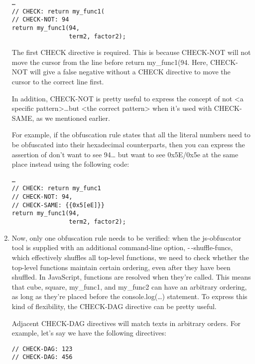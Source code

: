 \begin{enumerate}
\begin{lstlisting}[style=styleJavaScript]
…
// CHECK: return my_func1(
// CHECK-NOT: 94
return my_func1(94,
				term2, factor2);
\end{lstlisting}

\begin{tcolorbox}[colback=blue!5!white,colframe=blue!75!black, fonttitle=\bfseries,title=Note]
\hspace*{0.7cm}The first CHECK directive is required. This is because CHECK-NOT will not move the cursor from the line before return my\_func1(94. Here, CHECK-NOT will give a false negative without a CHECK directive to move the cursor to the correct line first.
\end{tcolorbox}

In addition, CHECK-NOT is pretty useful to express the concept of not <a specific pattern>…but <the correct pattern> when it's used with CHECK-SAME, as we mentioned earlier.

For example, if the obfuscation rule states that all the literal numbers need to be obfuscated into their hexadecimal counterparts, then you can express the assertion of don't want to see 94… but want to see 0x5E/0x5e at the same place instead using the following code:

\begin{lstlisting}[style=styleJavaScript]
…
// CHECK: return my_func1
// CHECK-NOT: 94,
// CHECK-SAME: {{0x5[eE]}}
return my_func1(94,
				term2, factor2);
\end{lstlisting}

\item Now, only one obfuscation rule needs to be verified: when the js-obfuscator tool is supplied with an additional command-line option, -\,-shuffle-funcs, which effectively shuffles all top-level functions, we need to check whether the top-level functions maintain certain ordering, even after they have been shuffled. In JavaScript, functions are resolved when they're called. This means that cube, square, my\_func1, and my\_func2 can have an arbitrary ordering, as long as they're placed before the console.log(…) statement. To express this kind of flexibility, the CHECK-DAG directive can be pretty useful.

Adjacent CHECK-DAG directives will match texts in arbitrary orders. For example, let's say we have the following directives:

\begin{lstlisting}[style=styleJavaScript]
// CHECK-DAG: 123
// CHECK-DAG: 456
\end{lstlisting}


\end{enumerate}
